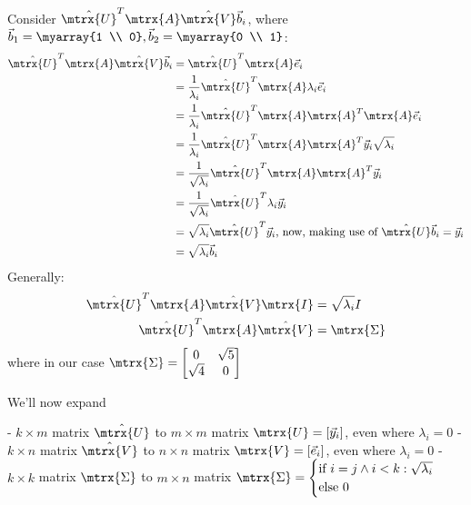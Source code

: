 Consider $\hat{\mtrx{U}}^T \mtrx{A} \hat{\mtrx{V}} \vec{b}_i$, where $\vec{b}_1 = \myarray{1 \\ 0}, \vec{b}_2 = \myarray{0 \\ 1}$:
\begin{equation}
    \begin{aligned}
        \hat{\mtrx{U}}^T \mtrx{A} \hat{\mtrx{V}} \vec{b}_i  &= \hat{\mtrx{U}}^T \mtrx{A} \vec{e}_i \\
                                                            &= \frac{1}{\lambda_i} \hat{\mtrx{U}}^T \mtrx{A} \lambda_i \vec{e}_i \\
                                                            &= \frac{1}{\lambda_i} \hat{\mtrx{U}}^T \mtrx{A} \mtrx{A}^T \mtrx{A} \vec{e}_i \\
                                                            &= \frac{1}{\lambda_i} \hat{\mtrx{U}}^T \mtrx{A} \mtrx{A}^T \vec{y}_i \sqrt{\lambda_i} \\
                                                            &= \frac{1}{\sqrt{\lambda_i}} \hat{\mtrx{U}}^T \mtrx{A} \mtrx{A}^T \vec{y}_i \\
                                                            &= \frac{1}{\sqrt{\lambda_i}} \hat{\mtrx{U}}^T \lambda_i \vec{y}_i \\
                                                            &= \sqrt{\lambda_i} \hat{\mtrx{U}}^T \vec{y}_i \text{, now, making use of } \hat{\mtrx{U}} \vec{b}_i = \vec{y}_i \\
                                                            &= \sqrt{\lambda_i} \vec{b}_i
    \end{aligned}
\end{equation}
Generally:
\begin{equation}
    \begin{aligned}
        \hat{\mtrx{U}}^T \mtrx{A} \hat{\mtrx{V}} \mtrx{I} &= \sqrt{\lambda_i} I \\
        \hat{\mtrx{U}}^T \mtrx{A} \hat{\mtrx{V}}   &= \mtrx{\Sigma}
    \end{aligned}
\end{equation}
where in our case $\mtrx{\Sigma} = \begin{bmatrix}
    0 & \sqrt{5} \\
    \sqrt{4} & 0 
\end{bmatrix}$

We'll now expand

    - $k \times m$ matrix $\hat{\mtrx{U}}$ to $m \times m$ matrix $\mtrx{U} = [\vec{y}_i]$, even where $\lambda_i = 0$
    - $k \times n$ matrix $\hat{\mtrx{V}}$ to $n \times n$ matrix $\mtrx{V} = [\vec{e}_i]$, even where $\lambda_i = 0$
    - $k \times k$ matrix $\mtrx{\Sigma}$ to $m \times n$ matrix $\mtrx{\Sigma} = \begin{cases}
        \text{if } i = j \land i < k: \sqrt{\lambda_i} \\
        \text{else } 0
    \end{cases}$

